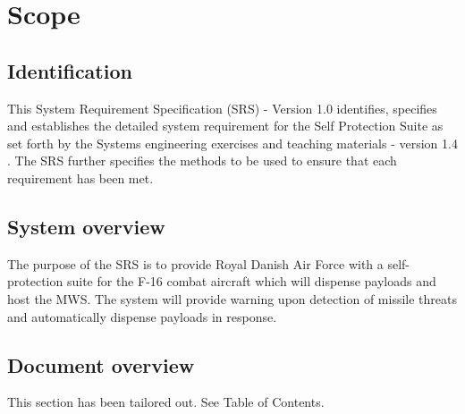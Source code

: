 \documentclass[Main]{subfiles}
\begin{document}
\chapter{Scope}

\section{Identification}
This System Requirement Specification (SRS) - Version 1.0 identifies, specifies and establishes the detailed system requirement for the Self Protection Suite as set forth by the Systems engineering exercises and teaching materials - version 1.4 \cite{SE-book}.
The SRS further specifies the methods to be used to ensure that each requirement has been met. 

\section{System overview}
The purpose of the SRS is to provide Royal Danish Air Force with a self-protection suite for the F-16 combat aircraft which will dispense payloads and host the MWS. 
The system will provide warning upon detection of missile threats and automatically dispense payloads in response.

\section{Document overview}
This section has been tailored out. See Table of Contents.
\end{document}
